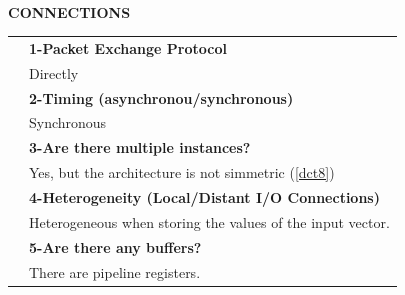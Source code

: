 \newpage{\large\textbf{ }}\vspace{10pt}\\
{\large\textbf{CONNECTIONS}}\vspace{10pt}\\\begin{tabular}{ p{0.2cm} p{14.5cm}}
	&\textbf{1-Packet Exchange Protocol}\\
	&Directly\vspace{7pt}\\
	&\textbf{2-Timing (asynchronou/synchronous)}\\
	&Synchronous\vspace{7pt}\\
	&\textbf{3-Are there multiple instances? }\\
	&Yes, but the architecture is not simmetric (\ref{dct8})\vspace{7pt}\\
	&\textbf{4-Heterogeneity (Local/Distant I/O Connections)}\\
	&Heterogeneous when storing the values of the input vector.\vspace{7pt}\\
	&\textbf{5-Are there any buffers?}\\
	&There are pipeline registers.
\end{tabular}\vspace{14pt}\\
